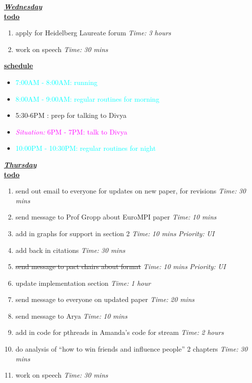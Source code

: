 \documentclass[11pt]{article}
\newcommand{\doneTask}[1]{\item \sout{#1}}
\newcommand{\timeEst}[1]{\textit{Time:} \textit{#1}}
\newcommand{\priority}[1]{\textit{Priority:} \textit{#1}}
\newcommand{\regItem}[1]{\item \textcolor{cyan}{#1}}
\newcommand{\situationItem}[1]{\item \textcolor{magenta}{\textit{Situation:} #1}}
\begin{document}
\underline{\textbf{\textit{Wednesday}}}\\
\underline{\textbf{todo}}\\
\begin{enumerate}
\item apply for Heidelberg Laureate forum \timeEst{3 hours}
\item work on speech \timeEst{30 mins}
\end{enumerate}
\underline{\textbf{schedule}}\\
\begin{itemize}
\regItem{7:00AM - 8:00AM: running}
\regItem{8:00AM - 9:00AM: regular routines for morning}
\item 5:30-6PM : prep for talking to Divya
\situationItem {6PM - 7PM: talk to Divya}
\regItem{10:00PM - 10:30PM: regular routines for night}

\end{itemize}

\underline{\textbf{\textit{Thursday}}}\\
\underline{\textbf{todo}}\\
\begin{enumerate}
\item send out email to everyone for updates on new paper, for revisions  \timeEst{30 mins}
\item send message to Prof Gropp about EuroMPI paper \timeEst{10 mins}
\item add in graphs for support in section 2 \timeEst{10 mins} \priority{UI}
\item add back in citations \timeEst{30 mins}
\doneTask{ send message to pact chairs about format} \timeEst{10 mins} \priority{UI}
\item update implementation section \timeEst{1 hour}
\item send message to everyone on updated paper \timeEst{20 mins}
\item send message to Arya \timeEst{10 mins}
\item add in code for pthreads in Amanda's code for stream \timeEst{2 hours}
\item do analysis of ``how to win friends and influence people'' 2 chapters \timeEst{30 mins}
\item work on speech \timeEst{30 mins}

\end{enumerate}
\end{document}
